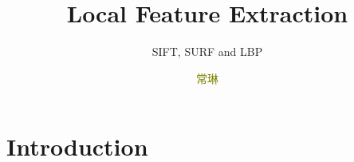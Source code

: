 \documentclass[notheorems, serif, table, compress]{beamer}  %
\begin{document}
\title{Local Feature Extraction }
\subtitle{SIFT, SURF and LBP}
\author[]{\textcolor{olive}{常琳}}
\frame{ \titlepage }
\def\hilite<#1>{\temporal<#1>{\color{blue!15}}{\color{black}}{\color{black}}}
\newcommand{\shadow}[2][purple]{\hskip5pt\shadowbox{\color{#1}\small \kai #2\vspace{3mm}}}
\newcommand{\colorrbox}[2][purple]{\doublebox{\color{#1}\small \kai#2}}


\section{Introduction} 
\end{document}

